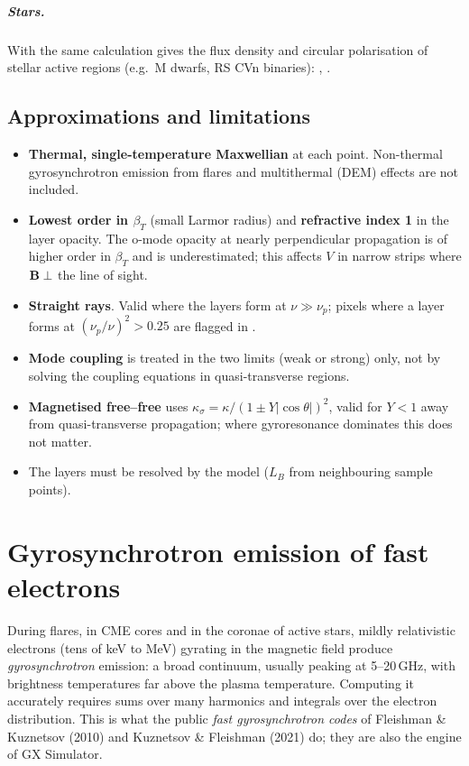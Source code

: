 \paragraph{Stars.} With  the same calculation gives the flux density
and circular polarisation of stellar active regions (e.g.\ M dwarfs, RS CVn binaries):
, .

\section{Approximations and limitations}\label{sec:grlimits}
\begin{itemize}[itemsep=2pt]
\item \textbf{Thermal, single-temperature Maxwellian} at each point. Non-thermal
  gyrosynchrotron emission from flares and multithermal (DEM) effects are not included.
\item \textbf{Lowest order in $\beta_T$} (small Larmor radius) and \textbf{refractive
  index 1} in the layer opacity. The o-mode opacity at nearly perpendicular propagation is
  of higher order in $\beta_T$ and is underestimated; this affects $V$ in narrow strips
  where $\mathbf{B}\perp$ the line of sight.
\item \textbf{Straight rays}. Valid where the layers form at $\nu\gg\nu_p$; pixels where a
  layer forms at $(\nu_p/\nu)^2>0.25$ are flagged in .
\item \textbf{Mode coupling} is treated in the two limits (weak or strong) only, not by
  solving the coupling equations in quasi-transverse regions.
\item \textbf{Magnetised free--free} uses $\kappa_\sigma=\kappa/(1\pm Y|\cos\theta|)^2$,
  valid for $Y<1$ away from quasi-transverse propagation; where gyroresonance dominates
  this does not matter.
\item The layers must be resolved by the model ($L_B$ from neighbouring sample points).
\end{itemize}

\chapter{Gyrosynchrotron emission of fast electrons}\label{chap:gs}

During flares, in CME cores and in the coronae of active stars, mildly relativistic
electrons (tens of keV to MeV) gyrating in the magnetic field produce
\emph{gyrosynchrotron} emission: a broad continuum, usually peaking at 5--20\,GHz, with
brightness temperatures far above the plasma temperature. Computing it accurately
requires sums over many harmonics and integrals over the electron distribution. This is
what the public \emph{fast gyrosynchrotron codes} of Fleishman \& Kuznetsov (2010) and
Kuznetsov \& Fleishman (2021) do; they are also the engine of GX Simulator.

